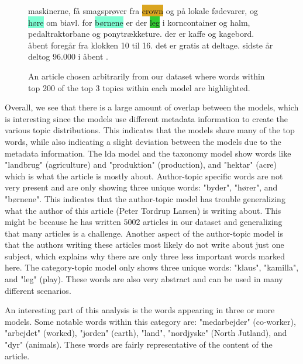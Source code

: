 \begin{figure}[h]
\begin{tcolorbox}[boxsep=5pt, top=0pt, bottom=0pt, left=0pt, right=0pt]
{maskinerne, få smagsprøver fra  \colorbox{Goldenrod}{crown} og på \colorbox{Peach}{lokale} fødevarer, og \colorbox{Aquamarine}{høre} om biavl. for \colorbox{Aquamarine}{børnene} er der \colorbox{LimeGreen}{leg} i korncontainer og halm, pedaltraktorbane og ponytrækketure. der er kaffe og kagebord. åbent  foregår  fra \colorbox{Peach}{klokken} 10 til 16. det er gratis at deltage. sidste år deltog 96.000  i åbent .
		}
	\end{tcolorbox}
	\caption{An article chosen arbitrarily from our dataset where words within top 200 of the top 3 topics within each model are highlighted.}
	\label{fig:the_article}
\end{figure}

Overall, we see that there is a large amount of overlap between the models, which is interesting since the models use different metadata information to create the various topic distributions.
This indicates that the models share many of the top words, while also indicating a slight deviation between the models due to the metadata information.
The \gls{lda} model and the taxonomy model show words like "landbrug" (agriculture) and "produktion" (production), and "hektar" (acre) which is what the article is mostly about.
Author-topic specific words are not very present and are only showing three unique words: "byder", "hører", and "børnene".
This indicates that the author-topic model has trouble generalizing what the author of this article (Peter Tordrup Larsen) is writing about. 
This might be because he has written $5002$ articles in our dataset and generalizing that many articles is a challenge.
Another aspect of the author-topic model is that the authors writing these articles most likely do not write about just one subject, which explains why there are only three less important words marked here. 
The category-topic model only shows three unique words: "klaus", "kamilla", and "leg" (play).
These words are also very abstract and can be used in many different scenarios.

An interesting part of this analysis is the words appearing in three or more models.
Some notable words within this category are: "medarbejder" (co-worker), "arbejdet" (worked), "jorden" (earth), "land", "nordjyske" (North Jutland), and "dyr" (animals).
These words are fairly representative of the content of the article.

